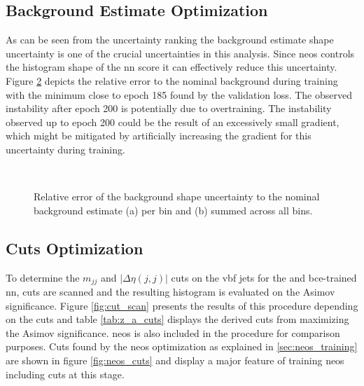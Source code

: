 \begin{figure}
    \centering
    \caption[]{}
    \label{fig:neos_valid_kde_hists}
\end{figure}


\subsection{Background Estimate Optimization}
As can be seen from the uncertainty ranking the background estimate shape uncertainty is one of the crucial uncertainties in this analysis. Since \ac{neos} controls the histogram shape of the \ac{nn} score it can effectively reduce this uncertainty. Figure \ref{fig:neos_valid_bkg_shape_sys} depicts the relative error to the nominal background during training with the minimum close to epoch 185 found by the validation loss. The observed instability after epoch 200 is potentially due to overtraining. The instability observed up to epoch 200 could be the result of an excessively small gradient, which might be mitigated by artificially increasing the gradient for this uncertainty during training.
\begin{figure}
    \centering
    \\
    \caption[]{Relative error of the background shape uncertainty to the nominal background estimate (a) per bin and (b) summed across all bins.}
    \label{fig:neos_valid_bkg_shape_sys}
\end{figure}

\subsection{Cuts Optimization}
To determine the $m_{jj}$ and $|\Delta\eta(j,j)|$ cuts on the \ac{vbf} jets for the \mhh and \ac{bce}-trained \ac{nn}, cuts are scanned and the resulting histogram is evaluated on the Asimov significance. Figure \ref{fig:cut_scan} presents the results of this procedure depending on the cuts and table \ref{tab:z_a_cuts} displays the derived cuts from maximizing the Asimov significance. \ac{neos} is also included in the procedure for comparison purposes. Cuts found by the \ac{neos} optimization as explained in \ref{sec:neos_training} are shown in figure \ref{fig:neos_cuts} and display a major feature of training \ac{neos} including cuts at this stage.

